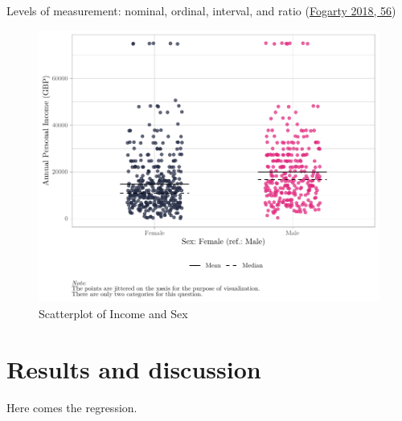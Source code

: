 \documentclass[
]{article}
\begin{document}
Levels of measurement: nominal, ordinal, interval, and ratio
(\protect\hyperlink{ref-fogarty2018quantitative}{Fogarty 2018, 56})

\begin{figure}[H]

{\centering \includegraphics[width=0.8\linewidth]{paper_files/figure-latex/unnamed-chunk-2-1} 

}

\caption{Scatterplot of Income and Sex}\label{fig:unnamed-chunk-2}
\end{figure}

\hypertarget{results-and-discussion}{%
\section{Results and discussion}\label{results-and-discussion}}

Here comes the regression.
\end{document}
